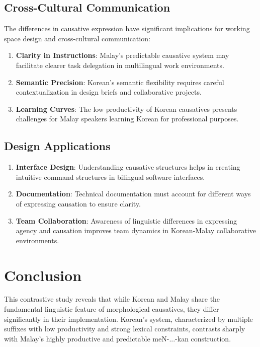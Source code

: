 \documentclass[12pt,a4paper]{article}
\begin{document}
\subsection{Cross-Cultural Communication}

The differences in causative expression have significant implications for working space design and cross-cultural communication:

\begin{enumerate}
\item \textbf{Clarity in Instructions}: Malay's predictable causative system may facilitate clearer task delegation in multilingual work environments.

\item \textbf{Semantic Precision}: Korean's semantic flexibility requires careful contextualization in design briefs and collaborative projects.

\item \textbf{Learning Curves}: The low productivity of Korean causatives presents challenges for Malay speakers learning Korean for professional purposes.
\end{enumerate}

\subsection{Design Applications}

\begin{enumerate}
\item \textbf{Interface Design}: Understanding causative structures helps in creating intuitive command structures in bilingual software interfaces.

\item \textbf{Documentation}: Technical documentation must account for different ways of expressing causation to ensure clarity.

\item \textbf{Team Collaboration}: Awareness of linguistic differences in expressing agency and causation improves team dynamics in Korean-Malay collaborative environments.
\end{enumerate}

\section{Conclusion}

This contrastive study reveals that while Korean and Malay share the fundamental linguistic feature of morphological causatives, they differ significantly in their implementation. Korean's system, characterized by multiple suffixes with low productivity and strong lexical constraints, contrasts sharply with Malay's highly productive and predictable meN-...-kan construction.
\end{document}
